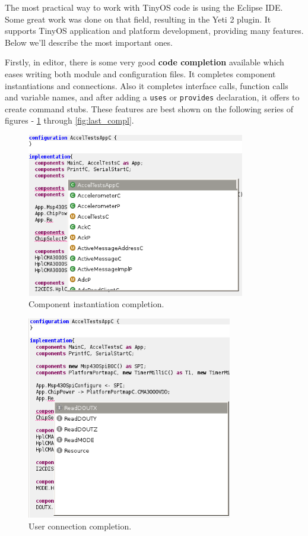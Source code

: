 The most practical way to work with TinyOS code is using the Eclipse
IDE. Some great work was done on that field, resulting in the Yeti 2
plugin. It supports TinyOS application and platform development,
providing many features. Below we'll describe the most important ones.

Firstly, in editor, there is some very good {\bf code completion} available
which eases writing both module and configuration files. It completes
component instantiations and connections. Also it completes interface
calls, function calls and variable names, and after adding a
\texttt{uses} or \texttt{provides} declaration, it offers to create
command stubs. These features are best shown on the following series of
figures - \ref{fig:first_compl} through \ref{fig:last_compl}.

\begin{figure}[h]
  \centering
  \includegraphics[width=0.85\textwidth]{img/eclipse_compl1.png}
  \caption{Component instantiation completion.}
  \label{fig:first_compl}
\end{figure}

\begin{figure}[h]
  \centering
  \includegraphics[width=0.8\textwidth]{img/eclipse_compl2.png}
  \caption{User connection completion.}
\end{figure}

